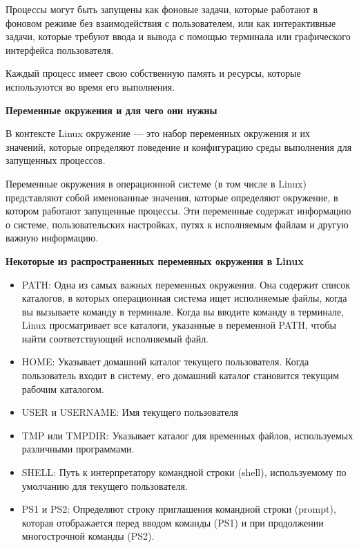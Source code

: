\documentclass[oneside, final, 14pt]{extreport} %
\begin{document}
Процессы могут быть запущены как фоновые задачи, которые работают в фоновом режиме без взаимодействия с пользователем, или как интерактивные задачи, которые требуют ввода и вывода с помощью терминала или графического интерфейса пользователя.

Каждый процесс имеет свою собственную память и ресурсы, которые используются во время его выполнения.

\vspace*{\baselineskip}

\textbf{Переменные окружения и для чего они нужны}


В контексте Linux окружение --- это набор переменных окружения и их значений, которые определяют поведение и конфигурацию среды выполнения для запущенных процессов. 

Переменные окружения в операционной системе (в том числе в Linux) представляют собой именованные значения, которые определяют окружение, в котором работают запущенные процессы. Эти переменные содержат информацию о системе, пользовательских настройках, путях к исполняемым файлам и другую важную информацию.

\vspace{\baselineskip}

\textbf{Некоторые из распространенных переменных окружения в Linux }

\begin{itemize}
    \item PATH: Одна из самых важных переменных окружения. Она содержит список каталогов, в которых операционная система ищет исполняемые файлы, когда вы вызываете команду в терминале. Когда вы вводите команду в терминале, Linux просматривает все каталоги, указанные в переменной PATH, чтобы найти соответствующий исполняемый файл.
    \item HOME: Указывает домашний каталог текущего пользователя. Когда пользователь входит в систему, его домашний каталог становится текущим рабочим каталогом.
    \item USER и USERNAME: Имя текущего пользователя
    \item TMP или TMPDIR: Указывает каталог для временных файлов, используемых различными программами.
    \item SHELL: Путь к интерпретатору командной строки (shell), используемому по умолчанию для текущего пользователя.
    \item PS1 и PS2: Определяют строку приглашения командной строки (prompt), которая отображается перед вводом команды (PS1) и при продолжении многострочной команды (PS2).
\end{itemize}
\end{document}
